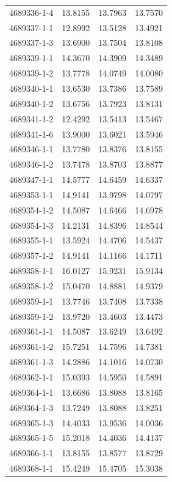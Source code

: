 \begin{longtable}{lrrr}
4689336-1-4 & 13.8155 & 13.7963 & 13.7570 \\
4689337-1-1 & 12.8992 & 13.5128 & 13.4921 \\
4689337-1-3 & 13.6900 & 13.7504 & 13.8108 \\
4689339-1-1 & 14.3670 & 14.3909 & 14.3489 \\
4689339-1-2 & 13.7778 & 14.0749 & 14.0080 \\
4689340-1-1 & 13.6530 & 13.7386 & 13.7589 \\
4689340-1-2 & 13.6756 & 13.7923 & 13.8131 \\
4689341-1-2 & 12.4292 & 13.5413 & 13.5467 \\
4689341-1-6 & 13.9000 & 13.6021 & 13.5946 \\
4689346-1-1 & 13.7780 & 13.8376 & 13.8155 \\
4689346-1-2 & 13.7478 & 13.8703 & 13.8877 \\
4689347-1-1 & 14.5777 & 14.6459 & 14.6337 \\
4689353-1-1 & 14.9141 & 13.9798 & 14.0797 \\
4689354-1-2 & 14.5087 & 14.6466 & 14.6978 \\
4689354-1-3 & 14.2131 & 14.8396 & 14.8544 \\
4689355-1-1 & 13.5924 & 14.4706 & 14.5437 \\
4689357-1-2 & 14.9141 & 14.1166 & 14.1711 \\
4689358-1-1 & 16.0127 & 15.9231 & 15.9134 \\
4689358-1-2 & 15.0470 & 14.8881 & 14.9379 \\
4689359-1-1 & 13.7746 & 13.7408 & 13.7338 \\
4689359-1-2 & 13.9720 & 13.4603 & 13.4473 \\
4689361-1-1 & 14.5087 & 13.6249 & 13.6492 \\
4689361-1-2 & 15.7251 & 14.7596 & 14.7381 \\
4689361-1-3 & 14.2886 & 14.1016 & 14.0730 \\
4689362-1-1 & 15.0393 & 14.5950 & 14.5891 \\
4689364-1-1 & 13.6686 & 13.8088 & 13.8165 \\
4689364-1-3 & 13.7249 & 13.8088 & 13.8251 \\
4689365-1-3 & 14.4033 & 13.9536 & 14.0036 \\
4689365-1-5 & 15.2018 & 14.4036 & 14.4137 \\
4689366-1-1 & 13.8155 & 13.8577 & 13.8729 \\
4689368-1-1 & 15.4249 & 15.4705 & 15.3038 \\

\end{longtable}
